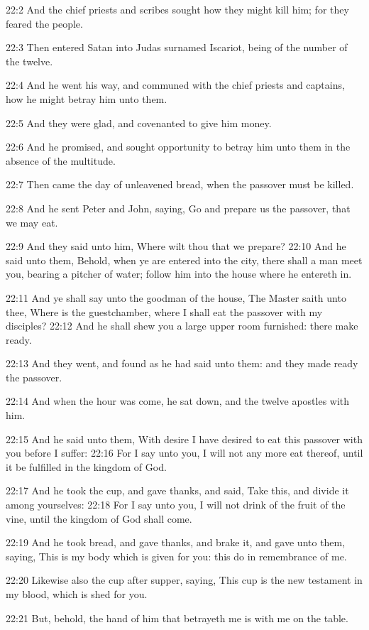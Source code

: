 22:2 And the chief priests and scribes sought how they might kill him;
for they feared the people.

22:3 Then entered Satan into Judas surnamed Iscariot, being of the
number of the twelve.

22:4 And he went his way, and communed with the chief priests and
captains, how he might betray him unto them.

22:5 And they were glad, and covenanted to give him money.

22:6 And he promised, and sought opportunity to betray him unto them
in the absence of the multitude.

22:7 Then came the day of unleavened bread, when the passover must be
killed.

22:8 And he sent Peter and John, saying, Go and prepare us the
passover, that we may eat.

22:9 And they said unto him, Where wilt thou that we prepare?  22:10
And he said unto them, Behold, when ye are entered into the city,
there shall a man meet you, bearing a pitcher of water; follow him
into the house where he entereth in.

22:11 And ye shall say unto the goodman of the house, The Master saith
unto thee, Where is the guestchamber, where I shall eat the passover
with my disciples?  22:12 And he shall shew you a large upper room
furnished: there make ready.

22:13 And they went, and found as he had said unto them: and they made
ready the passover.

22:14 And when the hour was come, he sat down, and the twelve apostles
with him.

22:15 And he said unto them, With desire I have desired to eat this
passover with you before I suffer: 22:16 For I say unto you, I will
not any more eat thereof, until it be fulfilled in the kingdom of God.

22:17 And he took the cup, and gave thanks, and said, Take this, and
divide it among yourselves: 22:18 For I say unto you, I will not drink
of the fruit of the vine, until the kingdom of God shall come.

22:19 And he took bread, and gave thanks, and brake it, and gave unto
them, saying, This is my body which is given for you: this do in
remembrance of me.

22:20 Likewise also the cup after supper, saying, This cup is the new
testament in my blood, which is shed for you.

22:21 But, behold, the hand of him that betrayeth me is with me on the
table.

